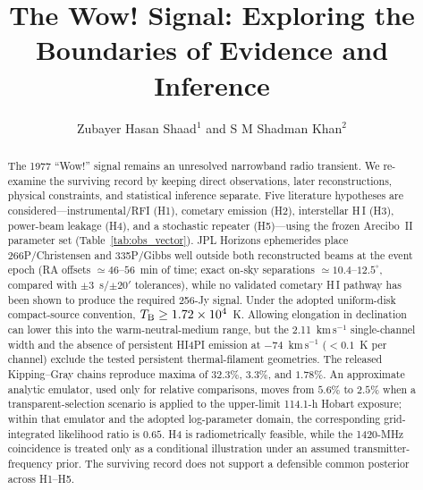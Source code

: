 \documentclass[crop]{CSL}
\newcommand{\tbeq}{T_{\rm B}}
\begin{document}
\title[The Wow! Signal]{The Wow! Signal: Exploring the Boundaries of Evidence and Inference}
\author[Shaad and Khan]{Zubayer Hasan Shaad$^{1}$ and S M Shadman Khan$^{2}$}
\address{ and }
\begin{abstract}
The 1977 ``Wow!'' signal remains an unresolved narrowband radio transient. We re-examine the surviving record by keeping direct observations, later reconstructions, physical constraints, and statistical inference separate. Five literature hypotheses are considered---instrumental/RFI (H1), cometary emission (H2), interstellar H\,I (H3), power-beam leakage (H4), and a stochastic repeater (H5)---using the frozen Arecibo~II parameter set \citep{mendez2025} (Table~\ref{tab:obs_vector}). JPL Horizons ephemerides place 266P/Christensen and 335P/Gibbs well outside both reconstructed beams at the event epoch (RA offsets $\simeq46$--$56$~min of time; exact on-sky separations $\simeq10.4$--$12.5^\circ$, compared with $\pm3$~s/$\pm20'$ tolerances), while no validated cometary H\,I pathway has been shown to produce the required 256-Jy signal. Under the adopted uniform-disk compact-source convention, $\tbeq\geq1.72\times10^4$~K. Allowing elongation in declination can lower this into the warm-neutral-medium range, but the 2.11~km\,s$^{-1}$ single-channel width and the absence of persistent HI4PI emission at $-74$~km\,s$^{-1}$ ($<0.1$~K per channel) exclude the tested persistent thermal-filament geometries. The released Kipping--Gray chains reproduce maxima of $32.3\%$, $3.3\%$, and $1.78\%$. An approximate analytic emulator, used only for relative comparisons, moves from $5.6\%$ to $2.5\%$ when a transparent-selection scenario is applied to the upper-limit 114.1-h Hobart exposure; within that emulator and the adopted log-parameter domain, the corresponding grid-integrated likelihood ratio is $0.65$. H4 is radiometrically feasible, while the 1420-MHz coincidence is treated only as a conditional illustration under an assumed transmitter-frequency prior. The surviving record does not support a defensible common posterior across H1--H5.
\end{abstract}
\end{document}
